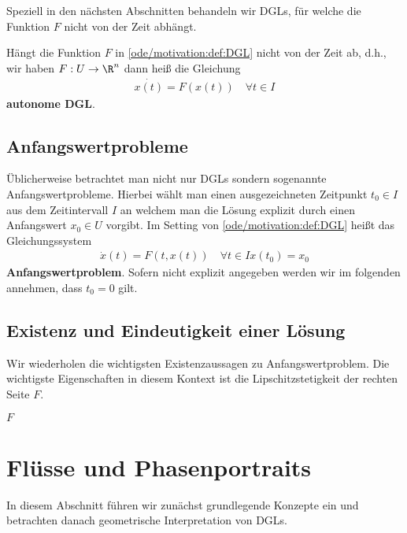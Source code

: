 \documentclass[letterpaper,10pt,english]{jupyterBook}
\begin{document}
Speziell in den nächsten Abschnitten behandeln wir DGLs, für welche die Funktion \(F\) nicht von der Zeit abhängt.
\label{ode/motivation:definition-1}
\begin{definition}{}{}



Hängt die Funktion \(F\) in \cref{ode/motivation:def:DGL}  nicht von der Zeit ab, d.h., wir haben \(F:U\rightarrow\R^n\) dann heiß die Gleichung
\begin{align}\label{equation:ode/motivation:eq:DGL}
\dot{x(t)} = F(x(t))\quad\forall t\in I
\end{align}
\textbf{autonome DGL}.
\end{definition}


\subsection{Anfangswertprobleme}
\label{\detokenize{ode/motivation:anfangswertprobleme}}
Üblicherweise betrachtet man nicht nur DGLs sondern sogenannte Anfangswertprobleme. Hierbei wählt man einen ausgezeichneten Zeitpunkt \(t_0\in I\) aus dem Zeitintervall \(I\) an welchem man die Lösung explizit durch einen Anfangswert \(x_0\in U\) vorgibt. Im Setting von \cref{ode/motivation:def:DGL}  heißt
das Gleichungssystem
\begin{align}\label{equation:ode/motivation:eq:AWP}
\dot{x}(t) = F(t, x(t))\quad\forall t\in I
x(t_0) = x_0
\end{align}
\textbf{Anfangswertproblem}. Sofern nicht explizit angegeben werden wir im folgenden annehmen, dass \(t_0=0\) gilt.


\subsection{Existenz und Eindeutigkeit einer Lösung}
\label{\detokenize{ode/motivation:existenz-und-eindeutigkeit-einer-losung}}
Wir wiederholen die wichtigsten Existenzaussagen zu Anfangswertproblem. Die wichtigste Eigenschaften in diesem Kontext ist die Lipschitzstetigkeit der rechten Seite \(F\).
\label{ode/motivation:definition-2}
\begin{definition}{}{}



\(F\)
\end{definition}


\section{Flüsse und Phasenportraits}
\label{\detokenize{ode/fluesse:flusse-und-phasenportraits}}\label{\detokenize{ode/fluesse::doc}}
In diesem Abschnitt führen wir zunächst grundlegende Konzepte ein und betrachten danach geometrische Interpretation von DGLs.
\end{document}
